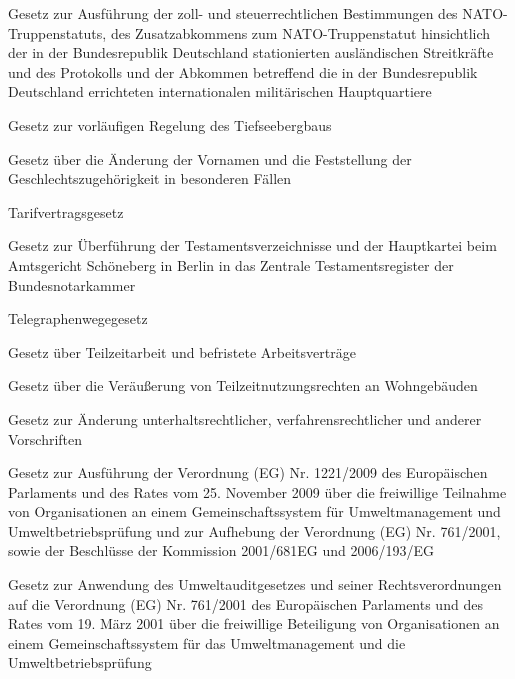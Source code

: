 \item[{TrZollG}] Gesetz zur Ausführung der zoll- und steuerrechtlichen Bestimmungen des NATO-Truppenstatuts, des Zusatzabkommens zum NATO-Truppenstatut hinsichtlich der in der Bundesrepublik Deutschland stationierten ausländischen Streitkräfte und des Protokolls und der Abkommen betreffend die in der Bundesrepublik Deutschland errichteten internationalen militärischen Hauptquartiere

\item[{TSeeBergbG}] Gesetz zur vorläufigen Regelung des Tiefseebergbaus

\item[{TSG}] Gesetz über die Änderung der Vornamen und die Feststellung der Geschlechtszugehörigkeit in besonderen Fällen

\item[{TVG}] Tarifvertragsgesetz

\item[{TVÜG}] Gesetz zur Überführung der Testamentsverzeichnisse und der Hauptkartei beim Amtsgericht Schöneberg in Berlin in das Zentrale Testamentsregister der Bundesnotarkammer

\item[{TWG}] Telegraphenwegegesetz

\item[{TzBfG}] Gesetz über Teilzeitarbeit und befristete Arbeitsverträge

\item[{TzWrG}] Gesetz über die Veräußerung von Teilzeitnutzungsrechten an Wohngebäuden

\item[{UÄndG}] Gesetz zur Änderung unterhaltsrechtlicher, verfahrensrechtlicher und anderer Vorschriften

\item[{UAG}] Gesetz zur Ausführung der Verordnung (EG) Nr. 1221/2009 des Europäischen Parlaments und des Rates vom 25. November 2009 über die freiwillige Teilnahme von Organisationen an einem Gemeinschaftssystem für Umweltmanagement und Umweltbetriebsprüfung und zur Aufhebung der Verordnung (EG) Nr. 761/2001, sowie der Beschlüsse der Kommission 2001/681EG und 2006/193/EG

\item[{UAGAnwG}] Gesetz zur Anwendung des Umweltauditgesetzes und seiner Rechtsverordnungen auf die Verordnung (EG) Nr. 761/2001 des Europäischen Parlaments und des Rates vom 19. März 2001 über die freiwillige Beteiligung von Organisationen an einem Gemeinschaftssystem für das Umweltmanagement und die Umweltbetriebsprüfung

